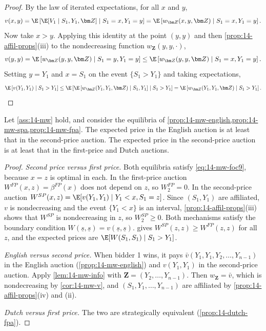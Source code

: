 \begin{proof}
By the law of iterated expectations, for all $x$ and $y$,
\begin{equation*}
  v(x,y)=\E\left[\E[V_1\mid S_1,Y_1,\bm Z]\mid S_1=x,Y_1=y\right]=\E\left[w_{\bm Z}(x,y,\bm Z)\mid S_1=x,Y_1=y\right].
\end{equation*}
Now take $x>y$. Applying this identity at the point $(y,y)$ and then \cref{prop:14-affil-props}(iii) to the
nondecreasing function $w_{\bm Z}(y,y,\cdot)$,
\begin{equation*}
  v(y,y)=\E\left[w_{\bm Z}(y,y,\bm Z)\mid S_1=y,Y_1=y\right]\le\E\left[w_{\bm Z}(y,y,\bm Z)\mid S_1=x,Y_1=y\right].
\end{equation*}
Setting $y=Y_1$ and $x=S_1$ on the event $\{S_1>Y_1\}$ and taking expectations,
\begin{equation*}
  \E\left[v(Y_1,Y_1)\mid S_1>Y_1\right]\le\E\left[\E\left[w_{\bm Z}(Y_1,Y_1,\bm Z)\mid S_1,Y_1\right]\mid S_1>Y_1\right]
  =\E\left[w_{\bm Z}(Y_1,Y_1,\bm Z)\mid S_1>Y_1\right].\qedhere
\end{equation*}
\end{proof}

\begin{proposition}\label{prop:14-mw-ranking}
Let \cref{ass:14-mw} hold, and consider the equilibria of
\cref{prop:14-mw-english,prop:14-mw-spa,prop:14-mw-fpa}. The expected price in the English auction is at least
that in the second-price auction. The expected price in the second-price auction is at least that in the
first-price and Dutch auctions.
\end{proposition}

\begin{proof}
\emph{Second price versus first price.} Both equilibria satisfy \eqref{eq:14-mw-foc9}, because $x=z$ is optimal in
each. In the first-price auction $W^{FP}(x,z)=\beta^{FP}(x)$ does not depend on $z$, so $W^{FP}_2=0$. In the
second-price auction $W^{SP}(x,z)=\E[v(Y_1,Y_1)\mid Y_1<x,S_1=z]$. Since $(S_1,Y_1)$ are affiliated, $v$ is
nondecreasing and the event $\{Y_1<x\}$ is an interval, \cref{prop:14-affil-props}(iii) shows that $W^{SP}$
is nondecreasing in $z$, so $W^{SP}_2\ge0$. Both mechanisms satisfy the boundary condition
$W(\underline s,\underline s)=v(\underline s,\underline s)$.  gives
$W^{SP}(z,z)\ge W^{FP}(z,z)$ for all $z$, and the expected prices are $\E[W(S_1,S_1)\mid S_1>Y_1]$.

\emph{English versus second price.} When bidder 1 wins, it pays $\bar v(Y_1,Y_1,Y_2,\dots,Y_{n-1})$ in the English
auction (\cref{prop:14-mw-english}) and $v(Y_1,Y_1)$ in the second-price auction. Apply \cref{lem:14-mw-info}
with $\bm Z=(Y_2,\dots,Y_{n-1})$. Then $w_{\bm Z}=\bar v$, which is nondecreasing by \cref{cor:14-mw-v}, and
$(S_1,Y_1,\dots,Y_{n-1})$ are affiliated by \cref{prop:14-affil-props}(iv) and (ii).

\emph{Dutch versus first price.} The two are strategically equivalent (\cref{prop:14-dutch-fpa}).
\end{proof}

